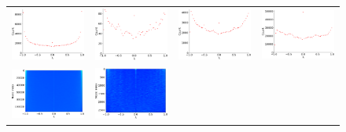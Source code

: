 \documentclass[senior,final,11pt]{iscs-thesis}
\begin{document}
\begin{figure}[htbp]
  \setlength\tabcolsep{0pt}
  \hspace{-3.0cm}
  \begin{tabular}{cccc}
    \includegraphics[width=45mm]{figure/road-luxembourg-osmmtx_dos.png} &
    \includegraphics[width=45mm]{figure/road-minnesotamtx_dos.png} &
    \includegraphics[width=45mm]{figure/road-usroadsmtx_dos.png} &
    \includegraphics[width=45mm]{figure/road-roadNet-PAmtx_dos.png} \\
    \includegraphics[width=45mm]{figure/road-luxembourg-osmmtx_pdos.png} &
    \includegraphics[width=45mm]{figure/road-minnesotamtx_pdos.png} &

\end{tabular}
\end{figure}
\end{document}
